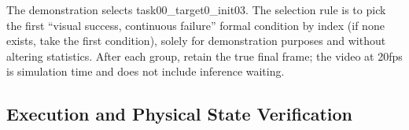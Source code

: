 
The demonstration selects task00\_target0\_init03. The selection rule is to pick the first ``visual success, continuous failure'' formal condition by index (if none exists, take the first condition), solely for demonstration purposes and without altering statistics. After each group, retain the true final frame; the video at 20fps is simulation time and does not include inference waiting.


\subsection{Execution and Physical State Verification}\label{s13-detail-5}

